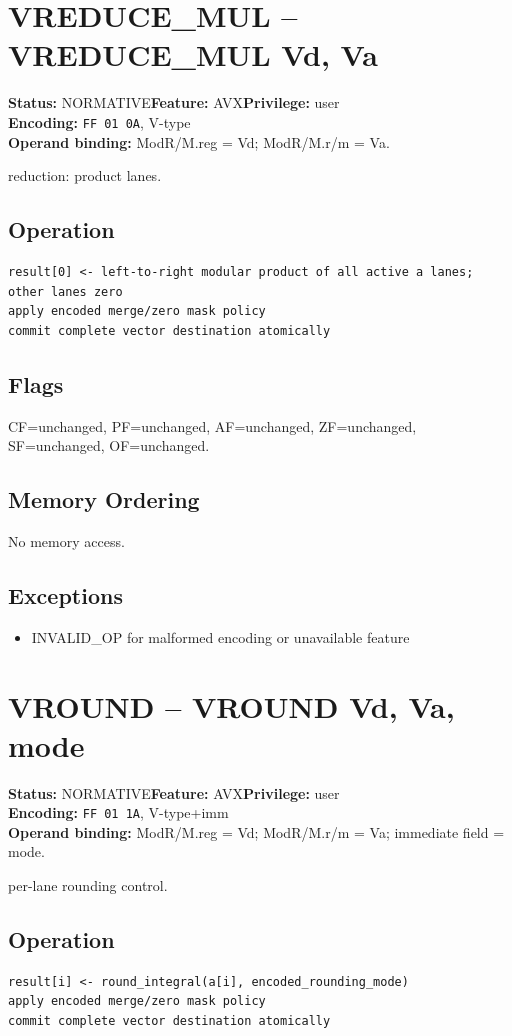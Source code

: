 \documentclass[10pt]{article}
\begin{document}
\section{VREDUCE\_MUL -- VREDUCE\_MUL Vd, Va}
\textbf{Status:} NORMATIVE\quad \textbf{Feature:} AVX\quad \textbf{Privilege:} user\\
\textbf{Encoding:} \texttt{FF 01 0A}, V-type\\
\textbf{Operand binding:} ModR/M.reg = Vd; ModR/M.r/m = Va.

reduction: product lanes.

\subsection*{Operation}
\begin{lstlisting}
result[0] <- left-to-right modular product of all active a lanes; other lanes zero
apply encoded merge/zero mask policy
commit complete vector destination atomically
\end{lstlisting}
\subsection*{Flags}
CF=unchanged, PF=unchanged, AF=unchanged, ZF=unchanged, SF=unchanged, OF=unchanged.
\subsection*{Memory Ordering}
No memory access.
\subsection*{Exceptions}
\begin{itemize}
\item INVALID\_OP for malformed encoding or unavailable feature
\end{itemize}
\clearpage

\section{VROUND -- VROUND Vd, Va, mode}
\textbf{Status:} NORMATIVE\quad \textbf{Feature:} AVX\quad \textbf{Privilege:} user\\
\textbf{Encoding:} \texttt{FF 01 1A}, V-type+imm\\
\textbf{Operand binding:} ModR/M.reg = Vd; ModR/M.r/m = Va; immediate field = mode.

per-lane rounding control.

\subsection*{Operation}
\begin{lstlisting}
result[i] <- round_integral(a[i], encoded_rounding_mode)
apply encoded merge/zero mask policy
commit complete vector destination atomically
\end{lstlisting}
\end{document}

